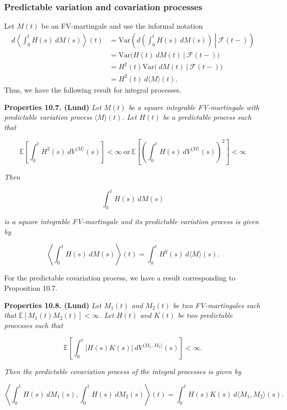 \documentclass[a4paper,10pt,openany]{book}
\begin{document}
\hypertarget{predictable-variation-and-covariation-processes-1}{%
\subsubsection{Predictable variation and covariation processes}\label{predictable-variation-and-covariation-processes-1}}

Let \(M(t)\) be an FV-martingale and use the informal notation
\begin{align*}
d\left\langle \int_0^t H(s)\ dM(s)\right\rangle(t)&=\text{Var}\left(\left.d\left(\int_0^t H(s)\ dM(s)\right)\ \right\vert\ \mathcal F(t-)\right)\\
&=\text{Var}\Big(\left.H(t)\ dM(t)\ \right\vert\ \mathcal F(t-)\Big)\\
&=H^2(t)\text{Var}\Big(\left.\ dM(t)\ \right\vert\ \mathcal F(t-)\Big)\\
&=H^2(t)\ d\langle M\rangle (t).
\end{align*}
Thus, we have the following result for integral processes.

\textbf{Properties 10.7. (Lund)} \emph{Let \(M(t)\) be a square integrable FV-martingale with predictable variation process \(\langle M\rangle(t)\). Let \(H(t)\) be a predictable process such that}

\[
\mathbb E\left[\int_0^t H^2(s)\ dV^{\langle M\rangle}(s)\right]<\infty\ \text{or}\ \mathbb E\left[\left(\int_0^t H(s)\ dV^{\langle M\rangle}(s)\right)^2\right]<\infty
\]

\emph{Then}

\[
\int_0^t H(s)\ dM(s)
\]

\emph{is a square integrable FV-martingale and its predictable variation process is given by}

\[
\left\langle \int_0^t H(s)\ dM(s)\right\rangle(t)=\int_0^t H^2(s)\ d\langle M\rangle (s).
\]

For the predictable covariation process, we have a result corresponding to Proposition 10.7.

\textbf{Properties 10.8. (Lund)} \emph{Let \(M_1(t)\) and \(M_2(t)\) be two FV-martingales such that \(\mathbb E[M_1(t)M_2(t)] < \infty\). Let \(H(t)\) and \(K(t)\) be two predictable processes such that}

\[
\mathbb E\left[\int_0^t \vert H(s) K(s)\vert\ dV^{\langle M_1,M_2\rangle }(s)\right]<\infty.
\]

\emph{Then the predictable covariation process of the integral processes is given by}

\[
\left\langle \int_0^t H(s)\ dM_1(s),\int_0^t H(s)\ dM_2(s)\right\rangle(t)=\int_0^t H(s)K(s)\ d\langle M_1,M_2\rangle (s).
\]
\end{document}
